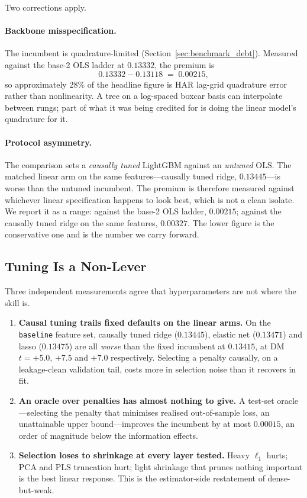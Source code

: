 Two corrections apply.

\paragraph{Backbone misspecification.} The incumbent is quadrature-limited
(Section~\ref{sec:benchmark_debt}). Measured against the base-2 OLS ladder at
$0.13332$, the premium is
\begin{equation}
  0.13332 - 0.13118 \;=\; 0.00215,
\end{equation}
so approximately 28\% of the headline figure is HAR lag-grid quadrature error
rather than nonlinearity. A tree on a log-spaced boxcar basis can interpolate
between rungs; part of what it was being credited for is doing the linear
model's quadrature for it.

\paragraph{Protocol asymmetry.} The comparison sets a \emph{causally tuned}
LightGBM against an \emph{untuned} OLS. The matched linear arm on the same
features---causally tuned ridge, $0.13445$---is worse than the untuned
incumbent. The premium is therefore measured against whichever linear
specification happens to look best, which is not a clean isolate. We report it
as a range: against the base-2 OLS ladder, $0.00215$; against the causally
tuned ridge on the same features, $0.00327$. The lower figure is the
conservative one and is the number we carry forward.

\subsection{Tuning Is a Non-Lever}
\label{sec:tuning_nonlever}

Three independent measurements agree that hyperparameters are not where the
skill is.

\begin{enumerate}
  \item \textbf{Causal tuning trails fixed defaults on the linear arms.} On the
    \texttt{baseline} feature set, causally tuned ridge ($0.13445$), elastic
    net ($0.13471$) and lasso ($0.13475$) are all \emph{worse} than the fixed
    incumbent at $0.13415$, at DM $t = +5.0$, $+7.5$ and $+7.0$ respectively.
    Selecting a penalty causally, on a leakage-clean validation tail, costs
    more in selection noise than it recovers in fit.
  \item \textbf{An oracle over penalties has almost nothing to give.} A
    test-set oracle---selecting the penalty that minimises realised
    out-of-sample loss, an unattainable upper bound---improves the incumbent by
    at most $0.00015$, an order of magnitude below the information effects.
  \item \textbf{Selection loses to shrinkage at every layer tested.} Heavy
    $\ell_1$ hurts; PCA and PLS truncation hurt; light shrinkage that prunes
    nothing important is the best linear response. This is the estimator-side
    restatement of dense-but-weak.
\end{enumerate}

